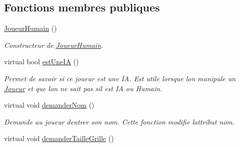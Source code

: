\subsection*{Fonctions membres publiques}
\begin{DoxyCompactItemize}
\item 
\hyperlink{class_joueur_humain_a99ef059054b5092967730224bf84f4b3}{Joueur\+Humain} ()\hypertarget{class_joueur_humain_a99ef059054b5092967730224bf84f4b3}{}\label{class_joueur_humain_a99ef059054b5092967730224bf84f4b3}

\begin{DoxyCompactList}\small\item\em Constructeur de \hyperlink{class_joueur_humain}{Joueur\+Humain}. \end{DoxyCompactList}\item 
virtual bool \hyperlink{class_joueur_humain_a4d531faca2e5f81966ff11309bd1fd9e}{est\+Une\+IA} ()
\begin{DoxyCompactList}\small\item\em Permet de savoir si ce joueur est une IA. Est utile lorsque l\textquotesingle{}on manipule un \hyperlink{class_joueur}{Joueur} et que l\textquotesingle{}on ne sait pas s\textquotesingle{}il est IA ou Humain. \end{DoxyCompactList}\item 
virtual void \hyperlink{class_joueur_humain_a1e47a65bf854cc9922c4d13c1715f76e}{demander\+Nom} ()\hypertarget{class_joueur_humain_a1e47a65bf854cc9922c4d13c1715f76e}{}\label{class_joueur_humain_a1e47a65bf854cc9922c4d13c1715f76e}

\begin{DoxyCompactList}\small\item\em Demande au joueur d\textquotesingle{}entrer son nom. Cette fonction modifie l\textquotesingle{}attribut nom. \end{DoxyCompactList}\item 
virtual void \hyperlink{class_joueur_humain_a50296a0ed2dbce1527011140e6b4af0a}{demander\+Taille\+Grille} ()\hypertarget{class_joueur_humain_a50296a0ed2dbce1527011140e6b4af0a}{}\label{class_joueur_humain_a50296a0ed2dbce1527011140e6b4af0a}


\end{DoxyCompactItemize}
